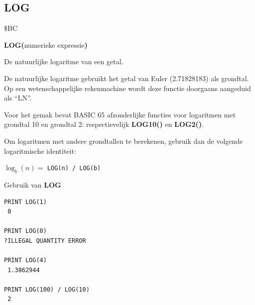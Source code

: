 \subsection{LOG}
\begin{description}[leftmargin=2cm,style=nextline]
\item [Token:]    \$BC

\item [Formaat:]   {\bf LOG(}numerieke expressie{\bf)}

\item [Retourneert:]  De natuurlijke logaritme van een getal.

                  De natuurlijke logaritme gebruikt het getal van Euler (2.71828183) als grondtal. Op een wetenschappelijke rekenmachine wordt deze functie doorgaans aangeduid als ``LN''.

\item [Opmerkingen:]  Voor het gemak bevat BASIC 65 afzonderlijke functies voor logaritmen met grondtal 10 en grondtal 2: respectievelijk {\bf LOG10()} en {\bf LOG2()}.

                  Om logaritmen met andere grondtallen te berekenen, gebruik dan de volgende logaritmische identiteit:

                  $\log_b(n) =$ \texttt{LOG(n) / LOG(b)}

\item [Voorbeelden:] Gebruik van {\bf LOG}

\begin{tcolorbox}[colback=black,coltext=white]
\verbatimfont{\codefont}
\begin{verbatim}
PRINT LOG(1)
 0

PRINT LOG(0)
?ILLEGAL QUANTITY ERROR

PRINT LOG(4)
 1.3862944

PRINT LOG(100) / LOG(10)
 2
\end{verbatim}
\end{tcolorbox}
\end{description}


\newpage
